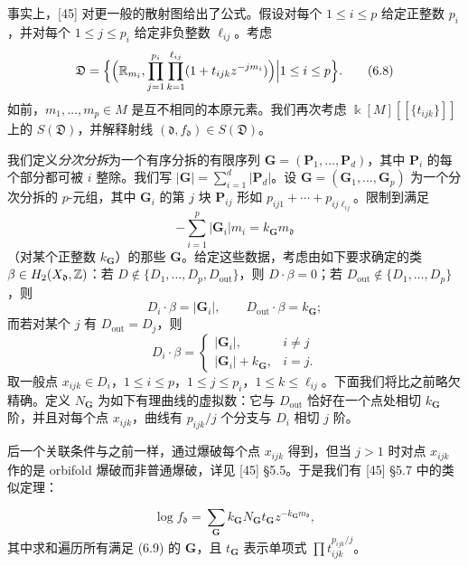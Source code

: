 事实上，[45] 对更一般的散射图给出了公式。假设对每个 $1\le i\le p$ 给定正整数 $p_i$，并对每个 $1\le j\le p_i$ 给定非负整数 $\ell_{ij}$。考虑
\begin{equation}
\mathfrak{D}=\Big\{\Big(\mathbb{R}_{m_i},\prod_{j=1}^{p_i}\prod_{k=1}^{\ell_{ij}}(1+t_{ijk}z^{-jm_i})\Big)\Big|1\le i\le p\Big\}.
\tag{6.8}
\end{equation}
如前，$m_1,\dots,m_p\in M$ 是互不相同的本原元素。我们再次考虑 $ \Bbbk[M][\![\{t_{ijk}\}]\!]$ 上的 $S(\mathfrak{D})$，并解释射线 $(\mathfrak{d},f_{\mathfrak{d}})\in S(\mathfrak{D})$。

我们定义\emph{分次分拆}为一个有序分拆的有限序列 $\mathbf{G}=(\mathbf{P}_1,\dots,\mathbf{P}_d)$，其中 $\mathbf{P}_i$ 的每个部分都可被 $i$ 整除。我们写 $|\mathbf{G}|=\sum_{i=1}^d|\mathbf{P}_d|$。设 $\mathbf{G}=(\mathbf{G}_1,\dots,\mathbf{G}_p)$ 为一个分次分拆的 $p$-元组，其中 $\mathbf{G}_i$ 的第 $j$ 块 $\mathbf{P}_{ij}$ 形如 $p_{ij1}+\cdots+p_{ij\ell_{ij}}$。限制到满足
\begin{equation}
-\sum_{i=1}^p|\mathbf{G}_i|m_i=k_{\mathbf{G}}m_{\mathfrak{d}}
\tag{6.9}
\end{equation}
（对某个正整数 $k_{\mathbf{G}}$）的那些 $\mathbf{G}$。给定这些数据，考虑由如下要求确定的类 $\beta\in H_2(X_{\mathfrak{d}},\mathbb{Z})$：若 $D\notin\{D_1,\dots,D_p,D_{\mathrm{out}}\}$，则 $D\cdot\beta=0$；若 $D_{\mathrm{out}}\notin\{D_1,\dots,D_p\}$，则
\[
D_i\cdot\beta=|\mathbf{G}_i|,\qquad D_{\mathrm{out}}\cdot\beta=k_{\mathbf{G}};
\]
而若对某个 $j$ 有 $D_{\mathrm{out}}=D_j$，则
\[
D_i\cdot\beta=\begin{cases}|\mathbf{G}_i|,&i\ne j\\ |\mathbf{G}_i|+k_{\mathbf{G}},&i=j.\end{cases}
\]
取一般点 $x_{ijk}\in D_i$，$1\le i\le p$，$1\le j\le p_i$，$1\le k\le\ell_{ij}$。下面我们将比之前略欠精确。定义 $N_{\mathbf{G}}$ 为如下有理曲线的虚拟数：它与 $D_{\mathrm{out}}$ 恰好在一个点处相切 $k_{\mathbf{G}}$ 阶，并且对每个点 $x_{ijk}$，曲线有 $p_{ijk}/j$ 个分支与 $D_i$ 相切 $j$ 阶。

后一个关联条件与之前一样，通过爆破每个点 $x_{ijk}$ 得到，但当 $j>1$ 时对点 $x_{ijk}$ 作的是 orbifold 爆破而非普通爆破，详见 [45] §5.5。于是我们有 [45] §5.7 中的类似定理：

\begin{theorem}
\[
\log f_{\mathfrak{d}}=\sum_{\mathbf{G}}k_{\mathbf{G}}N_{\mathbf{G}}t_{\mathbf{G}}z^{-k_{\mathbf{G}}m_{\mathfrak{d}}},
\]
其中求和遍历所有满足 (6.9) 的 $\mathbf{G}$，且 $t_{\mathbf{G}}$ 表示单项式 $\prod t_{ijk}^{p_{ijk}/j}$。
\end{theorem}

